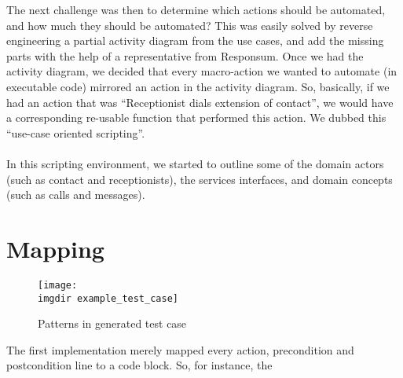 The next challenge was then to determine which actions should be automated, and how much they should be automated? This was easily solved by reverse engineering a partial activity diagram from the use cases, and add the missing parts with the help of a representative from Responsum. Once we had the activity diagram, we decided that every macro-action we wanted to automate (in executable code) mirrored an action in the activity diagram. So, basically, if we had an action that was ``Receptionist dials extension of contact'', we would have a corresponding re-usable function that performed this action. We dubbed this ``use-case oriented scripting''.\\\\
In this scripting environment, we started to outline some of the domain actors (such as contact and receptionists), the services interfaces, and domain concepts (such as calls and messages).

\section{Mapping}

\begin{figure}[ht]
\centering
\texttt{[image: \\imgdir example\_test\_case]}
\caption{Patterns in generated test case}
\label{fig:domain_model}
\end{figure}
The first implementation merely mapped every action, precondition and postcondition line to a code block. So, for instance, the %

